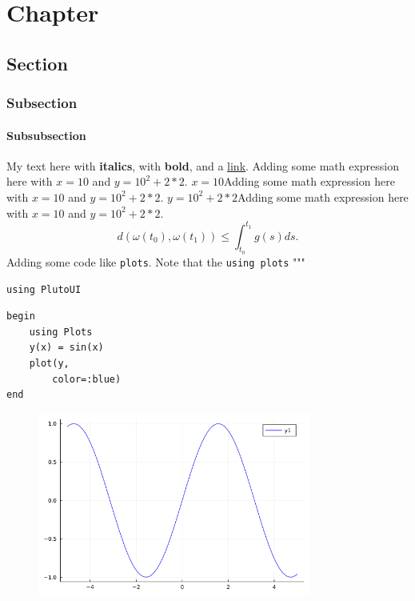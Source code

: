 \newpage
\chapter{Chapter}
\section{Section}
\subsection{Subsection}
\subsubsection{Subsubsection}
My text here with \textbf{italics}, with \textbf{bold}, and a \href{https://davibarreira.github.io/}{link}.  Adding some math expression here with $x=10$ and $y = 10^2 + 2*2$. $x=10$Adding some math expression here with $x=10$ and $y = 10^2 + 2*2$. $y = 10^2 + 2*2$Adding some math expression here with $x=10$ and $y = 10^2 + 2*2$. 
\begin{displaymath}
	d(\omega(t_0),\omega(t_1)) \leq \int^{t_1}_{t_0}g(s) ds.
\end{displaymath} Adding some code like  \lstinline{plots}. Note that the  \lstinline{using plots} """ 
\begin{lstlisting}[language=JuliaLocal, style=julia]
using PlutoUI
\end{lstlisting}

\begin{lstlisting}[language=JuliaLocal, style=julia]
begin
	using Plots
	y(x) = sin(x)
	plot(y,
		color=:blue)
end
\end{lstlisting}

\begin{figure}[H]
	\centering
	\includegraphics[width=0.8\textwidth]{./figures/examplepluto_figure1.png}
	\label{fig:examplepluto_figure1.png}

\end{figure}

